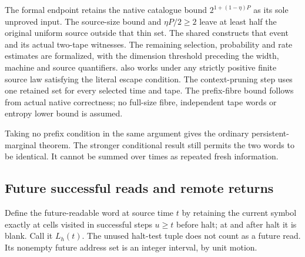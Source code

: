 \begin{informalproof}
The formal endpoint retains the native catalogue bound
$2^{1+(1-\eta)P}$ as its sole unproved input. The source-size bound and
$\eta P/2\ge2$ leave at least half the original uniform source outside
that thin set. The shared
 constructs
that event and its actual two-tape witnesses. The remaining selection,
probability and rate estimates are formalized, with the dimension threshold
preceding the width, machine and source quantifiers.
 also works under any
strictly positive finite source law satisfying the literal escape condition.
The context-pruning step uses one retained set for every selected time and
tape. The prefix-fibre bound follows from actual native correctness; no
full-size fibre, independent tape words or entropy lower bound is assumed.
\end{informalproof}

Taking no prefix condition in the same argument gives the ordinary
persistent-marginal theorem. The stronger conditional result still permits
the two words to be identical. It cannot be summed over times as repeated
fresh information.

\subsection{Future successful reads and remote returns}

Define the future-readable word at source time $t$ by retaining the current
symbol exactly at cells visited in successful steps $u\ge t$ before halt;
at and after halt it is blank. Call it $L_h(t)$. The unused halt-test tuple
does not count as a future read. Its nonempty future address set is an integer
interval, by unit motion.

